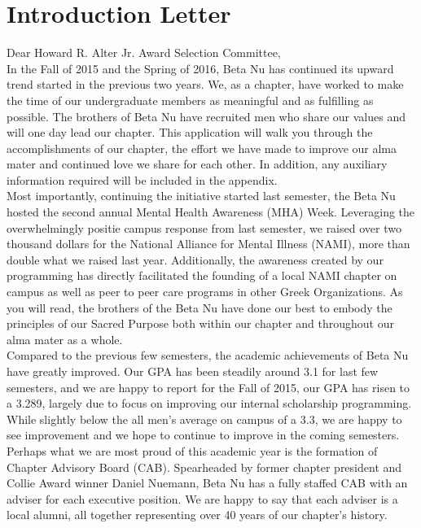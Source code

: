 \chapter{Introduction Letter}

Dear Howard R. Alter Jr. Award Selection Committee, \\

In the Fall of 2015 and the Spring of 2016, Beta Nu has continued its upward trend started in the previous two years. We, as a chapter, have worked to make the time of our undergraduate members as meaningful and as fulfilling as possible.  The brothers of Beta Nu have recruited men who share our values and will one day lead our chapter. This application will walk you through the accomplishments of our chapter, the effort we have made to improve our alma mater and continued love we share for each other. In addition, any auxiliary information required will be included in the appendix. \\

Most importantly, continuing the initiative started last semester, the Beta Nu hosted the second annual Mental Health Awareness (MHA) Week. Leveraging the overwhelmingly positie campus response from last semester, we raised over two thousand dollars for the National Alliance for Mental Illness (NAMI), more than double what we raised last year. Additionally, the awareness created by our programming has directly facilitated the founding of a local NAMI chapter on campus as well as peer to peer care programs in other Greek Organizations. As you will read, the brothers of the Beta Nu have done our best to embody the principles of our Sacred Purpose both within our chapter and throughout our alma mater as a whole. \\

Compared to the previous few semesters, the academic achievements of Beta Nu have greatly improved. Our GPA has been steadily around 3.1 for last few semesters, and we are happy to report for the Fall of 2015, our GPA has risen to a 3.289, largely due to focus on improving our internal scholarship programming. While slightly below the all men’s average on campus of a 3.3, we are happy to see improvement and we hope to continue to improve in the coming semesters. \\

Perhaps what we are most proud of this academic year is the formation of Chapter Advisory Board (CAB). Spearheaded by former chapter president and Collie Award winner Daniel Nuemann, Beta Nu has a fully staffed CAB with an adviser for each executive position. We are happy to say that each adviser is a local alumni, all together representing over 40 years of our chapter’s history. \\

